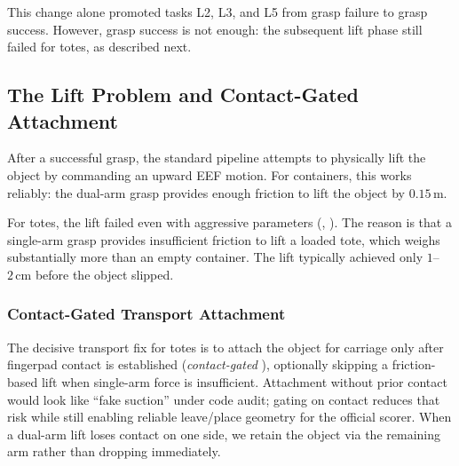 This change alone promoted tasks L2, L3, and L5 from grasp failure to grasp success. However, grasp success is not enough: the subsequent lift phase still failed for totes, as described next.

\subsection{The Lift Problem and Contact-Gated Attachment}
\label{sec:scripted_grasp:lift}

After a successful grasp, the standard pipeline attempts to physically lift the object by commanding an upward EEF motion. For containers, this works reliably: the dual-arm grasp provides enough friction to lift the object by $0.15\,\mathrm{m}$.

For totes, the lift failed even with aggressive parameters (, ). The reason is that a single-arm grasp provides insufficient friction to lift a loaded tote, which weighs substantially more than an empty container. The lift typically achieved only $1$--$2\,\mathrm{cm}$ before the object slipped.

\subsubsection{Contact-Gated Transport Attachment}
\label{sec:scripted_grasp:skip_lift}
\label{sec:scripted_grasp:strategy}

The decisive transport fix for totes is to attach the object for carriage only after fingerpad contact is established (\emph{contact-gated} ), optionally skipping a friction-based lift when single-arm force is insufficient. Attachment without prior contact would look like ``fake suction'' under code audit; gating on contact reduces that risk while still enabling reliable leave/place geometry for the official scorer. When a dual-arm lift loses contact on one side, we retain the object via the remaining arm rather than dropping immediately.

